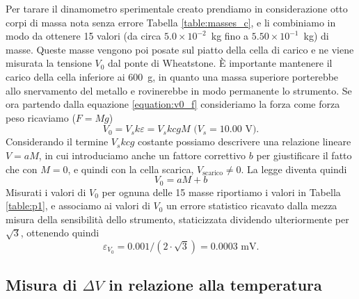 \documentclass[italian, a4paper, 10pt, twocolumn]{../../style/lab_unige}
\newcommand{\reftab}[1]{Tabella {\ref{#1}}}%
\newcommand{\mstdErr}[1]{\varepsilon_{#1}}
\begin{document}
    Per tarare il dinamometro sperimentale creato prendiamo in considerazione otto corpi di massa nota senza errore \reftab{table:masses_c}, e li combiniamo in modo da ottenere 15 valori (da circa $5.0\times10^{-2}$~kg fino a $5.50\times10^{-1}$~kg) di masse. Queste masse vengono poi posate sul piatto della cella di carico e ne viene misurata la tensione $V_0$ dal ponte di Wheatstone. È importante mantenere il carico della cella inferiore ai 600~g, in quanto una massa superiore porterebbe allo snervamento del metallo e rovinerebbe in modo permanente lo strumento. 
    Se ora partendo dalla equazione \ref{equation:v0_f} consideriamo la forza come forza peso ricaviamo ($F=Mg$)
    \begin{equation}
        V_0=V_sk\varepsilon=V_skcgM\text{ ($V_s=10.00$~V).}\label{eqation:v0_mg}
    \end{equation}
    Considerando il termine $V_skcg$ costante possiamo descrivere una relazione lineare $V=aM$, in cui introduciamo anche un fattore correttivo $b$ per giustificare il fatto che con $M=0$, e quindi con la cella scarica, $V_{\text{scarico}}\neq0$. La legge diventa quindi
    \begin{equation}
        V_0=aM+b
    \end{equation}
    Misurati i valori di $V_0$ per ognuna delle 15 masse riportiamo i valori in \reftab{table:p1}, e associamo ai valori di $V_0$ un errore statistico ricavato dalla mezza misura della sensibilità dello strumento, staticizzata dividendo ulteriormente per $\sqrt{3}$, ottenendo quindi \[\mstdErr{V_0} = 0.001/(2\cdot\sqrt{3})=0.0003\text{ mV.}\]

    

    \subsection{Misura di $\Delta V$ in relazione alla temperatura}
\end{document}
